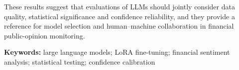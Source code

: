 These results suggest that evaluations of LLMs should jointly consider data quality, statistical significance and confidence reliability, and they provide a reference for model selection and human--machine collaboration in financial public-opinion monitoring.

\textbf{Keywords:} large language models; LoRA fine-tuning; financial sentiment analysis; statistical testing; confidence calibration

